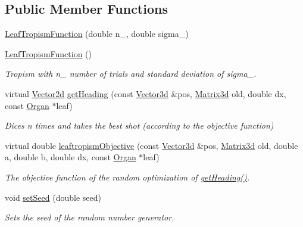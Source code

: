 \subsection*{Public Member Functions}
\begin{DoxyCompactItemize}
\item 
\hyperlink{classCPlantBox_1_1LeafTropismFunction_ad6f1d7478d104e20cd210fb69dee0d74}{Leaf\+Tropism\+Function} (double n\+\_\+, double sigma\+\_\+)
\item 
\hyperlink{classCPlantBox_1_1LeafTropismFunction_ab5227b152c52aff90ce8d267c71c401a}{Leaf\+Tropism\+Function} ()
\begin{DoxyCompactList}\small\item\em Tropism with n\+\_\+ number of trials and standard deviation of sigma\+\_\+. \end{DoxyCompactList}\item 
virtual \hyperlink{classCPlantBox_1_1Vector2d}{Vector2d} \hyperlink{classCPlantBox_1_1LeafTropismFunction_a1440868221a834474e34e3a503a74572}{get\+Heading} (const \hyperlink{classCPlantBox_1_1Vector3d}{Vector3d} \&pos, \hyperlink{classCPlantBox_1_1Matrix3d}{Matrix3d} old, double dx, const \hyperlink{classCPlantBox_1_1Organ}{Organ} $\ast$leaf)
\begin{DoxyCompactList}\small\item\em Dices n times and takes the best shot (according to the objective function) \end{DoxyCompactList}\item 
virtual double \hyperlink{classCPlantBox_1_1LeafTropismFunction_ab89f5f7e80103d80681bc8cadc220dba}{leaftropism\+Objective} (const \hyperlink{classCPlantBox_1_1Vector3d}{Vector3d} \&pos, \hyperlink{classCPlantBox_1_1Matrix3d}{Matrix3d} old, double a, double b, double dx, const \hyperlink{classCPlantBox_1_1Organ}{Organ} $\ast$leaf)
\begin{DoxyCompactList}\small\item\em The objective function of the random optimization of \hyperlink{classCPlantBox_1_1LeafTropismFunction_a1440868221a834474e34e3a503a74572}{get\+Heading()}. \end{DoxyCompactList}\item 
\mbox{\label{classCPlantBox_1_1LeafTropismFunction_a2d47f2a066887cb96dcff5ef440d3400}} 
void \hyperlink{classCPlantBox_1_1LeafTropismFunction_a2d47f2a066887cb96dcff5ef440d3400}{set\+Seed} (double seed)
\begin{DoxyCompactList}\small\item\em Sets the seed of the random number generator. \end{DoxyCompactList}\item 

\end{DoxyCompactItemize}
